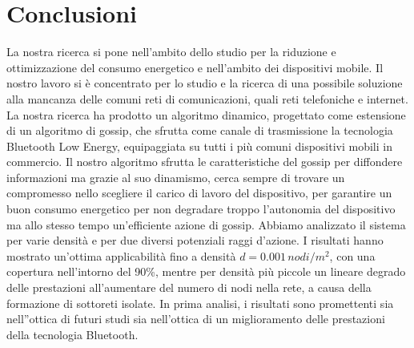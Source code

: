\chapter{Conclusioni}
\label{chap:conclusioni}

La nostra ricerca si pone nell'ambito dello studio per la riduzione e ottimizzazione del consumo energetico e nell'ambito dei dispositivi mobile.  Il nostro lavoro si è concentrato per lo studio e la ricerca di una possibile soluzione alla mancanza delle comuni reti di comunicazioni, quali reti telefoniche e internet. La nostra ricerca ha prodotto un algoritmo dinamico, progettato come estensione di un algoritmo di gossip, che sfrutta come canale di trasmissione la tecnologia Bluetooth Low Energy, equipaggiata su tutti i più comuni dispositivi mobili in commercio. Il nostro algoritmo sfrutta le caratteristiche del gossip per diffondere informazioni ma grazie al suo dinamismo, cerca sempre di trovare un compromesso nello scegliere il carico di lavoro del dispositivo, per garantire un buon consumo energetico per non degradare troppo l'autonomia del dispositivo ma allo stesso tempo un'efficiente azione di gossip. Abbiamo analizzato il sistema per varie densità e per due diversi potenziali raggi d'azione. I risultati hanno mostrato un'ottima applicabilità fino a densità $d=0.001\, nodi/m^2$, con una copertura nell'intorno del 90\%, mentre per densità più piccole un lineare degrado delle prestazioni all'aumentare del numero di nodi nella rete, a causa della formazione di sottoreti isolate. In prima analisi, i risultati sono promettenti sia nell''ottica di futuri studi sia nell'ottica di un miglioramento delle prestazioni della tecnologia Bluetooth.